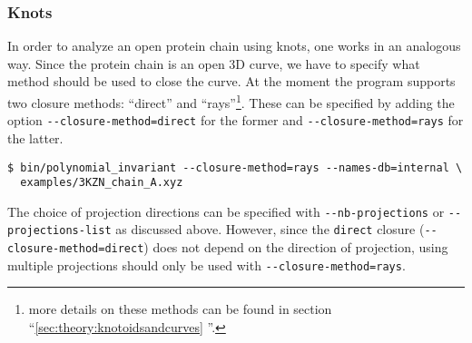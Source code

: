 \subsubsection{Knots}
In order to analyze an open protein chain using knots, one works in an analogous way. Since the protein chain is an open 3D curve, we have to specify what method should be used to close the curve. At the moment the program supports two closure methods: ``direct'' and ``rays''\footnote{more details on these methods can be found in section ``\ref{sec:theory:knotoidsandcurves} ''.}. These can be specified by adding the option \lstinline{--closure-method=direct} for the former and \lstinline{--closure-method=rays} for the latter.
\begin{lstlisting}
$ bin/polynomial_invariant --closure-method=rays --names-db=internal \
  examples/3KZN_chain_A.xyz
\end{lstlisting}

The choice of projection directions can be specified with \lstinline{--nb-projections} or \lstinline{--projections-list} as discussed above. However, since the \lstinline{direct} closure (\lstinline{--closure-method=direct}) does not depend on the direction of projection, using multiple projections should only be used with \lstinline{--closure-method=rays}.

